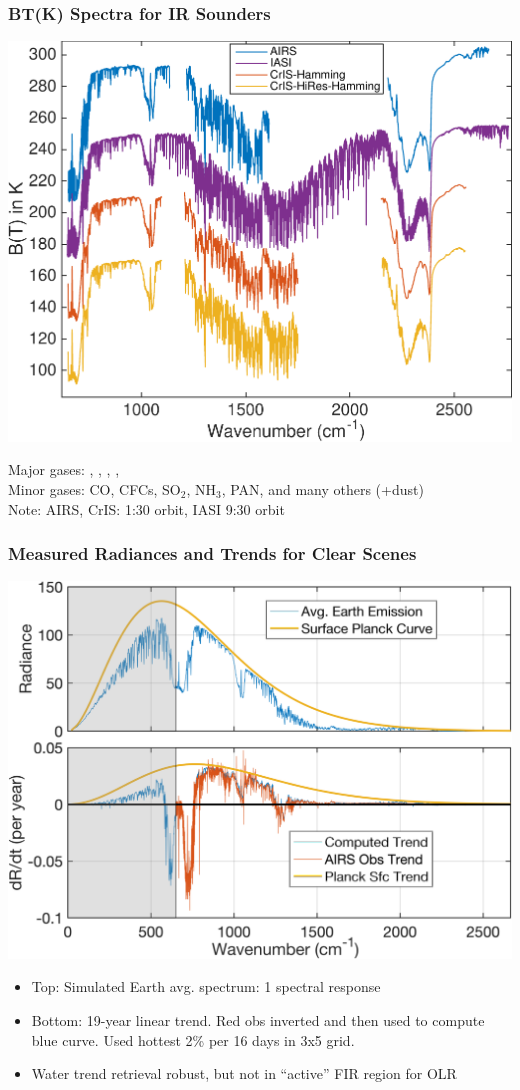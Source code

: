 \documentclass[10pt,t]{beamer}
\begin{document}
\begin{frame}
\frametitle{BT(K) Spectra for IR Sounders}  
\begin{center}
\vspace{-0.1in}
\includegraphics[width=0.75\linewidth]{SunClimate2022/hyperall_hamming.pdf}
\end{center}
\vspace{-0.1in}
\small Major gases: \cd, \water, \ozone, \methane, \nitrous \\
\small Minor gases: CO, CFCs, SO$_2$, NH$_3$, PAN, and many others (+dust) \\
\small Note: AIRS, CrIS: 1:30 orbit, IASI 9:30 orbit
\end{frame}
\begin{frame}
\frametitle{Measured Radiances and Trends for Clear Scenes}
\centering \includegraphics[width=0.7\linewidth]{Figslls/rad_trends_all_cm.png}
\begin{small}
\begin{itemize}
\item Top: Simulated Earth avg. spectrum: 1 \wn spectral response
\item Bottom: 19-year linear trend.  Red obs inverted and then used to compute blue curve.  Used hottest 2\% per 16 days in 3x5 grid.
\item Water trend retrieval robust, but not in ``active'' FIR region for OLR
\end{itemize}
\end{small}
\end{frame}
\end{document}
